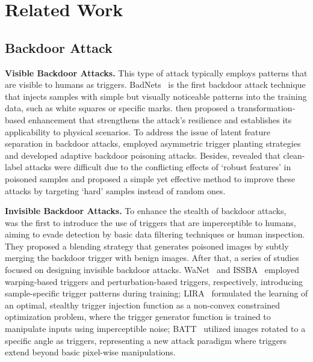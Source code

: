 \section{Related Work}
\label{sec:appen:background}

\subsection{Backdoor Attack}

\noindent\textbf{Visible Backdoor Attacks.}
This type of attack typically employs patterns that are visible to humans as triggers. BadNets~\citep{gu2019badnets} is the first backdoor attack technique that injects samples with simple but visually noticeable patterns into the training data, such as white squares or specific marks. \citet{li2021backdoor} then proposed a transformation-based enhancement that strengthens the attack's resilience and establishes its applicability to physical scenarios. To address the issue of latent feature separation in backdoor attacks, \citet{qi2023revisiting} employed asymmetric trigger planting strategies and developed adaptive backdoor poisoning attacks. Besides, \citet{gao2023not} revealed that clean-label attacks were difficult due to the conflicting effects of `robust features' in poisoned samples and proposed a simple yet effective method to improve these attacks by targeting ‘hard’ samples instead of random ones.

\noindent\textbf{Invisible Backdoor Attacks.}
To enhance the stealth of backdoor attacks, ~\citet{chen2017targeted} was the first to introduce the use of triggers that are imperceptible to humans, aiming to evade detection by basic data filtering techniques or human inspection. They proposed a blending strategy that generates poisoned images by subtly merging the backdoor trigger with benign images. After that, a series of studies focused on designing invisible backdoor attacks. WaNet~\citep{nguyen2021wanet} and ISSBA~\citep{li2021invisible} employed warping-based triggers and perturbation-based triggers, respectively, introducing sample-specific trigger patterns during training; LIRA~\citep{doan2021lira} formulated the learning of an optimal, stealthy trigger injection function as a non-convex constrained optimization problem, where the trigger generator function is trained to manipulate inputs using imperceptible noise; BATT~\citep{xu2023batt} utilized images rotated to a specific angle as triggers, representing a new attack paradigm where triggers extend beyond basic pixel-wise manipulations. 

